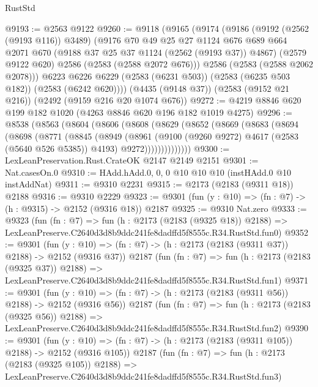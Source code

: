 \begin{lexlean}{RustStd}
\begin{coremodule}
@9193 := @2563 @9122
@9260 := @9118
    (@9165
      (@9174
        (@9186
          (@9192 (@2562 (@9193 @116)) @3489)
          (@9176
            @70
            @49
            @25
            @27
            @1124
            @676
            @689
            @664
            @2071
            @670
            (@9188 @37 @25 @37 @1124 (@2562 (@9193 @37)) @4867)
            (@2579 @9122 @620)
            @2586
            (@2583 (@2588 @2072 @676)))
          @2586
          (@2583 (@2588 @2062 @2078)))
        @6223
        @6226
        @6229
        (@2583 (@6231 @503))
        (@2583 (@6235 @503 @182))
        (@2583 (@6242 @620))))
    (@4435 (@9148 @37))
    (@2583 (@9152 @21 @216))
    (@2492 (@9159 @216 @20 @1074 @676))
@9272 := @4219 @8846 @620 @199 @182 @1020 (@4263 @8846 @620 @196 @182 @1019 @4275)
@9296 := @8538
    (@8563
      (@8604
        (@8606
          (@8608
            (@8629
              (@8652
                (@8669
                  (@8683
                    (@8694
                      (@8698
                        (@8771
                          (@8845
                            (@8949
                              (@8961
                                (@9100 (@9260 @9272) @4617 (@2583 (@5640 @526 @5385)) @4193)
                                @9272))))))))))))))
@9300 := LexLeanPreservation.Rust.CrateOK @2147 @2149 @2151
@9301 := Nat.casesOn.{0}
@9310 := HAdd.hAdd.{0, 0, 0} @10 @10 @10 (instHAdd.{0} @10 instAddNat)
@9311 := @9310 @2231
@9315 := @2173 (@2183 (@9311 @18)) @2188
@9316 := @9310 @2229
@9323 := @9301 (fun (y : @10) => (fn : @7) -> (h : @9315) -> @2152 (@9316 @18)) @2187
@9325 := @9310 Nat.zero
@9333 := @9323
    (fun (fn : @7) =>
    fun (h : @2173 (@2183 (@9325 @18)) @2188) =>
    LexLeanPreserve.C2640d3d8b9ddc241fe8dadffd5f8555c.R34.RustStd.fun0)
@9352 := @9301
    (fun (y : @10) => (fn : @7) -> (h : @2173 (@2183 (@9311 @37)) @2188) -> @2152 (@9316 @37))
    @2187
    (fun (fn : @7) =>
    fun (h : @2173 (@2183 (@9325 @37)) @2188) =>
    LexLeanPreserve.C2640d3d8b9ddc241fe8dadffd5f8555c.R34.RustStd.fun1)
@9371 := @9301
    (fun (y : @10) => (fn : @7) -> (h : @2173 (@2183 (@9311 @56)) @2188) -> @2152 (@9316 @56))
    @2187
    (fun (fn : @7) =>
    fun (h : @2173 (@2183 (@9325 @56)) @2188) =>
    LexLeanPreserve.C2640d3d8b9ddc241fe8dadffd5f8555c.R34.RustStd.fun2)
@9390 := @9301
    (fun (y : @10) => (fn : @7) -> (h : @2173 (@2183 (@9311 @105)) @2188) -> @2152 (@9316 @105))
    @2187
    (fun (fn : @7) =>
    fun (h : @2173 (@2183 (@9325 @105)) @2188) =>
    LexLeanPreserve.C2640d3d8b9ddc241fe8dadffd5f8555c.R34.RustStd.fun3)

\end{coremodule}
\end{lexlean}
